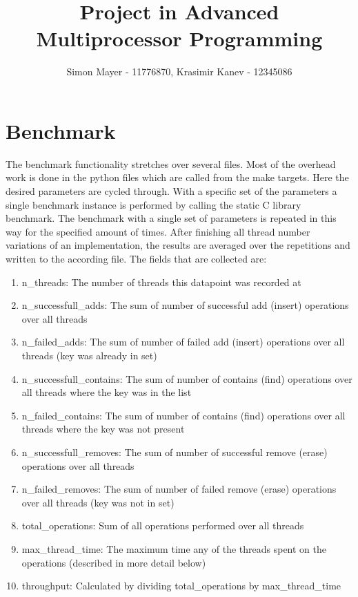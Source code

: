 \documentclass{article}
\begin{document}
\title{Project in Advanced Multiprocessor Programming}
\author{Simon Mayer - 11776870, Krasimir Kanev - 12345086}
\maketitle
\tableofcontents
\newpage
\section{Benchmark}

The benchmark functionality stretches over several files. 
Most of the overhead work is done in the python files which are called from the make targets. 
Here the desired parameters are cycled through. With a specific set of the parameters a single benchmark instance is performed by calling the static C library benchmark.
The benchmark with a single set of parameters is repeated in this way for the specified amount of times.
After finishing all thread number variations of an implementation, the results are averaged over the repetitions and written to the according file.
The fields that are collected are:
\begin{enumerate}
    \item n\_threads: The number of threads this datapoint was recorded at
    \item n\_successfull\_adds: The sum of number of successful add (insert) operations over all threads
    \item n\_failed\_adds: The sum of number of failed add (insert) operations over all threads (key was already in set)
    \item n\_successfull\_contains: The sum of number of contains (find) operations over all threads where the key was in the list
    \item n\_failed\_contains: The sum of number of contains (find) operations over all threads where the key was not present
    \item n\_successfull\_removes: The sum of number of successful remove (erase) operations over all threads
    \item n\_failed\_removes: The sum of number of failed remove (erase) operations over all threads (key was not in set)
    \item total\_operations: Sum of all operations performed over all threads
    \item max\_thread\_time: The maximum time any of the threads spent on the operations (described in more detail below)
    \item throughput: Calculated by dividing total\_operations by max\_thread\_time
\end{enumerate}
\end{document}
